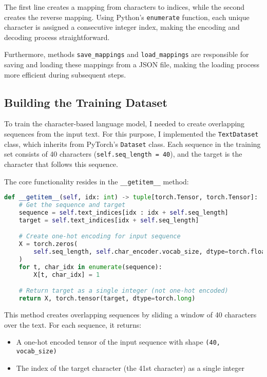 \documentclass[12pt]{article}
\begin{document}
The first line creates a mapping from characters to indices, while the second creates the reverse mapping. Using Python's \texttt{enumerate} function, each unique character is assigned a consecutive integer index, making the encoding and decoding process straightforward.

Furthermore, methods \texttt{save\_mappings} and \texttt{load\_mappings} are responsible for saving and loading these mappings from a JSON file, making the loading process more efficient during subsequent steps.


\subsection{Building the Training Dataset}

To train the character-based language model, I needed to create overlapping sequences from the input text. For this purpose, I implemented the \texttt{TextDataset} class, which inherits from PyTorch's \texttt{Dataset} class. Each sequence in the training set consists of 40 characters (\texttt{self.seq\_length = 40}), and the target is the character that follows this sequence.

The core functionality resides in the \texttt{\_\_getitem\_\_} method:

\begin{lstlisting}[language=Python]
def __getitem__(self, idx: int) -> tuple[torch.Tensor, torch.Tensor]:
    # Get the sequence and target
    sequence = self.text_indices[idx : idx + self.seq_length]
    target = self.text_indices[idx + self.seq_length]

    # Create one-hot encoding for input sequence
    X = torch.zeros(
        self.seq_length, self.char_encoder.vocab_size, dtype=torch.float32
    )
    for t, char_idx in enumerate(sequence):
        X[t, char_idx] = 1

    # Return target as a single integer (not one-hot encoded)
    return X, torch.tensor(target, dtype=torch.long)
\end{lstlisting}

This method creates overlapping sequences by sliding a window of 40 characters over the text. For each sequence, it returns:
\begin{itemize}
    \item A one-hot encoded tensor of the input sequence with shape \texttt{(40, vocab\_size)}
    \item The index of the target character (the 41st character) as a single integer
\end{itemize}
\end{document}
